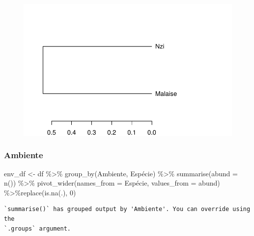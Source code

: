 \documentclass[
  letterpaper,
  DIV=11,
  numbers=noendperiod]{scrartcl}
\newenvironment{Shaded}{\begin{snugshade}}{\end{snugshade}}
\newcommand{\AttributeTok}[1]{\textcolor[rgb]{0.40,0.45,0.13}{#1}}
\newcommand{\DecValTok}[1]{\textcolor[rgb]{0.68,0.00,0.00}{#1}}
\newcommand{\FunctionTok}[1]{\textcolor[rgb]{0.28,0.35,0.67}{#1}}
\newcommand{\NormalTok}[1]{\textcolor[rgb]{0.00,0.23,0.31}{#1}}
\newcommand{\OtherTok}[1]{\textcolor[rgb]{0.00,0.23,0.31}{#1}}
\newcommand{\SpecialCharTok}[1]{\textcolor[rgb]{0.37,0.37,0.37}{#1}}
\begin{document}
\begin{figure}[H]

{\centering \includegraphics{report_nmds_files/figure-pdf/unnamed-chunk-19-1.pdf}

}

\end{figure}

\hypertarget{ambiente}{%
\subsubsection{Ambiente}\label{ambiente}}

\begin{Shaded}
\begin{Highlighting}[]
\NormalTok{env\_df }\OtherTok{\textless{}{-}}\NormalTok{ df }\SpecialCharTok{\%\textgreater{}\%} 
  \FunctionTok{group\_by}\NormalTok{(Ambiente, Espécie) }\SpecialCharTok{\%\textgreater{}\%}
  \FunctionTok{summarise}\NormalTok{(}\AttributeTok{abund =} \FunctionTok{n}\NormalTok{()) }\SpecialCharTok{\%\textgreater{}\%}
  \FunctionTok{pivot\_wider}\NormalTok{(}\AttributeTok{names\_from =}\NormalTok{ Espécie, }
              \AttributeTok{values\_from =}\NormalTok{ abund) }\SpecialCharTok{\%\textgreater{}\%}\FunctionTok{replace}\NormalTok{(}\FunctionTok{is.na}\NormalTok{(.), }\DecValTok{0}\NormalTok{)}
\end{Highlighting}
\end{Shaded}

\begin{verbatim}
`summarise()` has grouped output by 'Ambiente'. You can override using the
`.groups` argument.
\end{verbatim}
\end{document}
